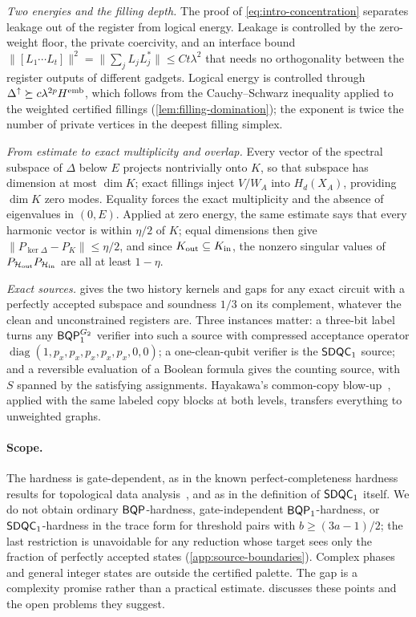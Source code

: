 \emph{Two energies and the filling depth.} The proof of \cref{eq:intro-concentration} separates leakage out of the register from logical energy. Leakage is controlled by the zero-weight floor, the private coercivity, and an interface bound \(\|[L_1\cdots L_t]\|^2=\|\sum_jL_jL_j^*\|\le Ct\lambda^2\) that needs no orthogonality between the register outputs of different gadgets. Logical energy is controlled through \(\Delta^\uparrow\succeq c\lambda^{2p}H^{\rm emb}\), which follows from the Cauchy--Schwarz inequality applied to the weighted certified fillings (\cref{lem:filling-domination}); the exponent is twice the number of private vertices in the deepest filling simplex.

\emph{From estimate to exact multiplicity and overlap.} Every vector of the spectral subspace of \(\Delta\) below \(E\) projects nontrivially onto \(K\), so that subspace has dimension at most \(\dim K\); exact fillings inject \(V/W_A\) into \(H_d(X_A)\), providing \(\dim K\) zero modes. Equality forces the exact multiplicity and the absence of eigenvalues in \((0,E)\). Applied at zero energy, the same estimate says that every harmonic vector is within \(\eta/2\) of \(K\); equal dimensions then give \(\|P_{\ker\Delta}-P_K\|\le\eta/2\), and since \(K_{\rm out}\subseteq K_{\rm in}\), the nonzero singular values of \(P_{\mathcal{H}_{\rm out}}P_{\mathcal{H}_{\rm in}}\) are all at least \(1-\eta\).

\emph{Exact sources.}  gives the two history kernels and gaps for any exact circuit with a perfectly accepted subspace and soundness \(1/3\) on its complement, whatever the clean and unconstrained registers are. Three instances matter: a three-bit label turns any \(\mathsf{BQP}_{1}^{G_2}\) verifier into such a source with compressed acceptance operator \(\operatorname{diag}(1,p_x,p_x,p_x,p_x,p_x,0,0)\); a one-clean-qubit verifier is the \(\mathsf{SDQC}_{1}\) source; and a reversible evaluation of a Boolean formula gives the counting source, with \(S\) spanned by the satisfying assignments. Hayakawa's common-copy blow-up~\cite{hayakawa2026unweighted}, applied with the same labeled copy blocks at both levels, transfers everything to unweighted graphs.

\paragraph{Scope.}
The hardness is gate-dependent, as in the known perfect-completeness hardness results for topological data analysis~\cite{crichigno2024clique,king2026gapped,gyurik2026provable}, and as in the definition of \(\mathsf{SDQC}_{1}\) itself. We do not obtain ordinary \(\mathsf{BQP}\)-hardness, gate-independent \(\mathsf{BQP}_{1}\)-hardness, or \(\mathsf{SDQC}_{1}\)-hardness in the trace form for threshold pairs with \(b\ge(3a-1)/2\); the last restriction is unavoidable for any reduction whose target sees only the fraction of perfectly accepted states (\cref{app:source-boundaries}). Complex phases and general integer states are outside the certified palette. The gap is a complexity promise rather than a practical estimate.  discusses these points and the open problems they suggest.

